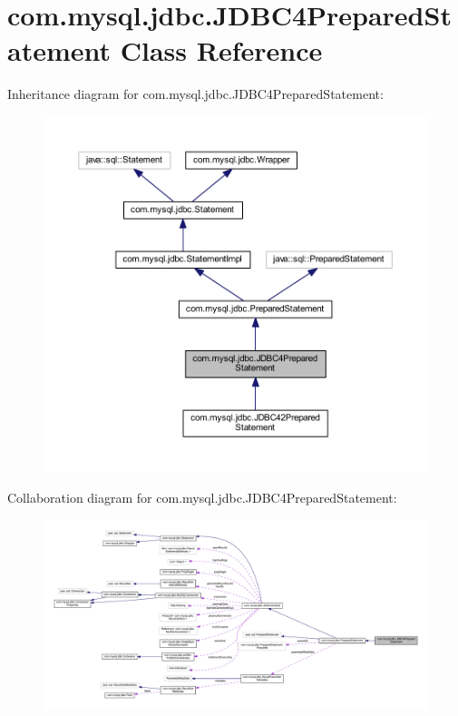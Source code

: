 \hypertarget{classcom_1_1mysql_1_1jdbc_1_1_j_d_b_c4_prepared_statement}{}\section{com.\+mysql.\+jdbc.\+J\+D\+B\+C4\+Prepared\+Statement Class Reference}
\label{classcom_1_1mysql_1_1jdbc_1_1_j_d_b_c4_prepared_statement}


Inheritance diagram for com.\+mysql.\+jdbc.\+J\+D\+B\+C4\+Prepared\+Statement\+:
\nopagebreak
\begin{figure}[H]
\begin{center}
\leavevmode
\includegraphics[width=350pt]{classcom_1_1mysql_1_1jdbc_1_1_j_d_b_c4_prepared_statement__inherit__graph}
\end{center}
\end{figure}


Collaboration diagram for com.\+mysql.\+jdbc.\+J\+D\+B\+C4\+Prepared\+Statement\+:
\nopagebreak
\begin{figure}[H]
\begin{center}
\leavevmode
\includegraphics[width=350pt]{classcom_1_1mysql_1_1jdbc_1_1_j_d_b_c4_prepared_statement__coll__graph}
\end{center}
\end{figure}
